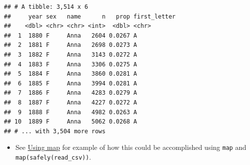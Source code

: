 \documentclass[]{book}
\newenvironment{Shaded}{\begin{snugshade}}{\end{snugshade}}
\newcommand{\CommentTok}[1]{\textcolor[rgb]{0.56,0.35,0.01}{\textit{#1}}}
\newcommand{\ControlFlowTok}[1]{\textcolor[rgb]{0.13,0.29,0.53}{\textbf{#1}}}
\newcommand{\DataTypeTok}[1]{\textcolor[rgb]{0.13,0.29,0.53}{#1}}
\newcommand{\KeywordTok}[1]{\textcolor[rgb]{0.13,0.29,0.53}{\textbf{#1}}}
\newcommand{\NormalTok}[1]{#1}
\newcommand{\OperatorTok}[1]{\textcolor[rgb]{0.81,0.36,0.00}{\textbf{#1}}}
\newcommand{\OtherTok}[1]{\textcolor[rgb]{0.56,0.35,0.01}{#1}}
\newcommand{\StringTok}[1]{\textcolor[rgb]{0.31,0.60,0.02}{#1}}
\providecommand{\tightlist}{%
  \setlength{\itemsep}{0pt}\setlength{\parskip}{0pt}}
\theoremstyle{definition}
\theoremstyle{definition}
\theoremstyle{definition}
\theoremstyle{remark}
\begin{document}
\begin{Shaded}
\end{Shaded}

\begin{verbatim}
## # A tibble: 3,514 x 6
##     year sex   name      n   prop first_letter
##    <dbl> <chr> <chr> <int>  <dbl> <chr>       
##  1  1880 F     Anna   2604 0.0267 A           
##  2  1881 F     Anna   2698 0.0273 A           
##  3  1882 F     Anna   3143 0.0272 A           
##  4  1883 F     Anna   3306 0.0275 A           
##  5  1884 F     Anna   3860 0.0281 A           
##  6  1885 F     Anna   3994 0.0281 A           
##  7  1886 F     Anna   4283 0.0279 A           
##  8  1887 F     Anna   4227 0.0272 A           
##  9  1888 F     Anna   4982 0.0263 A           
## 10  1889 F     Anna   5062 0.0268 A           
## # ... with 3,504 more rows
\end{verbatim}

\begin{itemize}
\tightlist
\item
  See \protect\hyperlink{using-map}{Using map} for example of how this
  could be accomplished using \texttt{map} and
  \texttt{map(safely(read\_csv))}.
\end{itemize}
\end{document}
